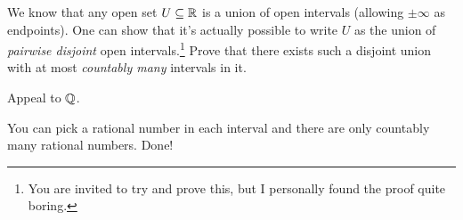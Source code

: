 \begin{problem}
	\gim
	We know that any open set $U \subseteq \mathbb R$
	is a union of open intervals (allowing $\pm\infty$ as endpoints).
	One can show that it's actually possible to write $U$ as the
	union of \emph{pairwise disjoint} open intervals.\footnote{You are invited to try
	and prove this, but I personally found the proof quite boring.}
	Prove that there exists such a disjoint union with at most \emph{countably many}
	intervals in it.
	\begin{hint}
		Appeal to $\mathbb Q$.
	\end{hint}
	\begin{sol}
		You can pick a rational number in each interval and
		there are only countably many rational numbers. Done!
	\end{sol}
\end{problem}

